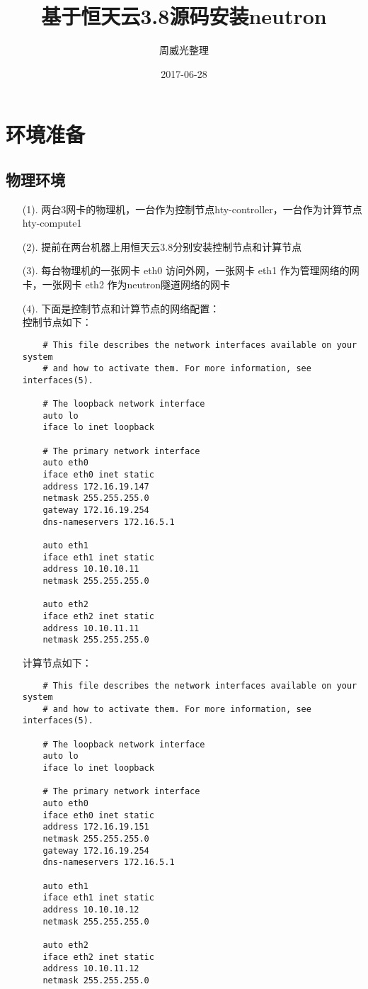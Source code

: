 \documentclass[a4paper,left=1.5cm,right=1.5cm,11pt]{article}
\title{基于恒天云3.8源码安装neutron}
\author{周威光整理}
\date{2017-06-28}
\begin{document}
\maketitle
\clearpage
\tableofcontents
\clearpage
\section{环境准备}
\subsection{物理环境}
\begin{itemize}
	\item[(1).]两台3网卡的物理机，一台作为控制节点hty-controller，一台作为计算节点hty-compute1
	\item[(2).]提前在两台机器上用恒天云3.8分别安装控制节点和计算节点
	\item[(3).]每台物理机的一张网卡 eth0 访问外网，一张网卡 eth1 作为管理网络的网卡，一张网卡 eth2 作为neutron隧道网络的网卡
	\item[(4).]下面是控制节点和计算节点的网络配置：\\
	控制节点如下：
	\begin{lstlisting}
	# This file describes the network interfaces available on your system
	# and how to activate them. For more information, see interfaces(5).

	# The loopback network interface
	auto lo
	iface lo inet loopback

	# The primary network interface
	auto eth0
	iface eth0 inet static
	address 172.16.19.147
	netmask 255.255.255.0
	gateway 172.16.19.254
	dns-nameservers 172.16.5.1

	auto eth1
	iface eth1 inet static
	address 10.10.10.11
	netmask 255.255.255.0

	auto eth2
	iface eth2 inet static
	address 10.10.11.11
	netmask 255.255.255.0
	\end{lstlisting}
	计算节点如下：
	\begin{lstlisting}
	# This file describes the network interfaces available on your system
	# and how to activate them. For more information, see interfaces(5).

	# The loopback network interface
	auto lo
	iface lo inet loopback

	# The primary network interface
	auto eth0
	iface eth0 inet static
	address 172.16.19.151
	netmask 255.255.255.0
	gateway 172.16.19.254
	dns-nameservers 172.16.5.1

	auto eth1
	iface eth1 inet static
	address 10.10.10.12
	netmask 255.255.255.0

	auto eth2
	iface eth2 inet static
	address 10.10.11.12 
	netmask 255.255.255.0
	\end{lstlisting}
\end{itemize}
\end{document}
